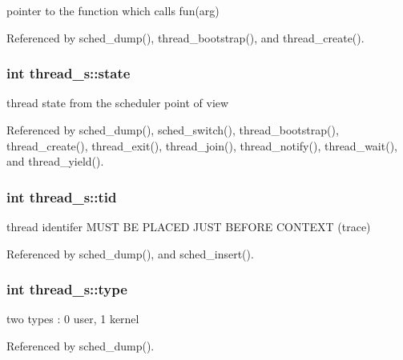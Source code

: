 pointer to the function which calls fun(arg) 



Referenced by sched\-\_\-dump(), thread\-\_\-bootstrap(), and thread\-\_\-create().

\hypertarget{structthread__s_ab3fce89938b5156047553299f71a1370}{
\subsubsection[{state}]{\setlength{\rightskip}{0pt plus 5cm}int thread\-\_\-s\-::state}}\label{structthread__s_ab3fce89938b5156047553299f71a1370}


thread state from the scheduler point of view 



Referenced by sched\-\_\-dump(), sched\-\_\-switch(), thread\-\_\-bootstrap(), thread\-\_\-create(), thread\-\_\-exit(), thread\-\_\-join(), thread\-\_\-notify(), thread\-\_\-wait(), and thread\-\_\-yield().

\hypertarget{structthread__s_ad1ed1d821f595f5a7c1d68f09ba36bf5}{
\subsubsection[{tid}]{\setlength{\rightskip}{0pt plus 5cm}int thread\-\_\-s\-::tid}}\label{structthread__s_ad1ed1d821f595f5a7c1d68f09ba36bf5}


thread identifer M\-U\-S\-T B\-E P\-L\-A\-C\-E\-D J\-U\-S\-T B\-E\-F\-O\-R\-E C\-O\-N\-T\-E\-X\-T (trace) 



Referenced by sched\-\_\-dump(), and sched\-\_\-insert().

\hypertarget{structthread__s_a2eda0c064f0ed88103b27bf2b5a640e2}{
\subsubsection[{type}]{\setlength{\rightskip}{0pt plus 5cm}int thread\-\_\-s\-::type}}\label{structthread__s_a2eda0c064f0ed88103b27bf2b5a640e2}


two types \-: 0 user, 1 kernel 



Referenced by sched\-\_\-dump().


